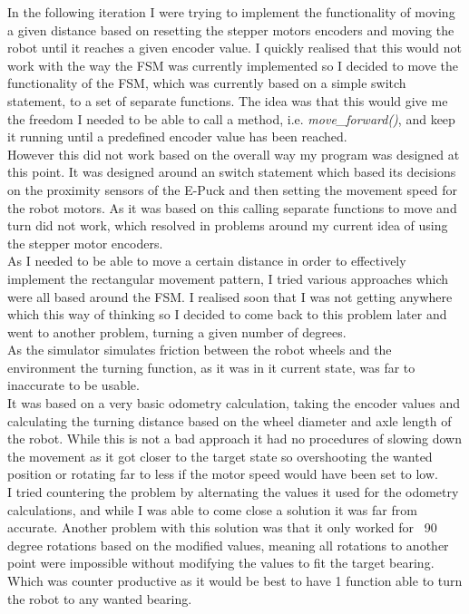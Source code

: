 In the following iteration I were trying to implement the functionality of moving a given distance based on resetting the stepper motors encoders and moving the robot until it reaches a given encoder value. I quickly realised that this would not work with the way the FSM was currently implemented so I decided to move the functionality of the FSM, which was currently based on a simple switch statement, to a set of separate functions. The idea was that this would give me the freedom I needed to be able to call a method, i.e. \textit{move\_forward()},  and keep it running until a predefined encoder value has been reached. \\
However this did not work based on the overall way my program was designed at this point. It was designed around an switch statement which based its decisions on the proximity sensors of the E-Puck and then setting the movement speed for the robot motors. As it was based on this calling separate functions to move and turn did not work, which resolved in problems around my current idea of using the stepper motor encoders. \\[3ex] 

As I needed to be able to move a certain distance in order to effectively implement the rectangular movement pattern, I tried various approaches which were all based around the FSM. 
I realised soon that I was not getting anywhere which this way of thinking so I decided to come back to this problem later and went to another problem, turning a given number of degrees. \\
As the simulator simulates friction between the robot wheels and the environment the turning function, as it was in it current state, was far to inaccurate to be usable. \\
It was based on a very basic odometry calculation, taking the encoder values and calculating the turning distance based on the wheel diameter and axle length of the robot. While this is not a bad approach it had no procedures of slowing down the movement as it got closer to the target state so overshooting the wanted position or rotating far to less if the motor speed would have been set to low. \\
I tried countering the problem by alternating the values it used for the odometry calculations, and while I was able to come close a solution it was far from accurate. Another problem with this solution was that it only worked for ~90 degree rotations based on the modified values, meaning all rotations to another point were impossible without modifying the values to fit the target bearing. Which was counter productive as it would be best to have 1 function able to turn the robot to any wanted bearing. \\

